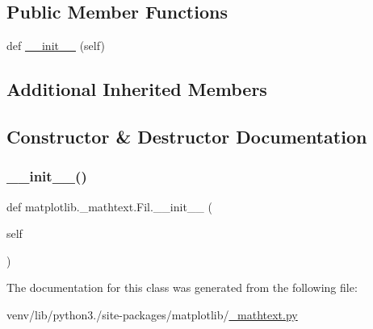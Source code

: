 \subsection*{Public Member Functions}
\begin{DoxyCompactItemize}
\item 
def \hyperlink{classmatplotlib_1_1__mathtext_1_1Fil_a9ff7506fe480a4bd200184d97f469ae5}{\+\_\+\+\_\+init\+\_\+\+\_\+} (self)
\end{DoxyCompactItemize}
\subsection*{Additional Inherited Members}


\subsection{Constructor \& Destructor Documentation}
\mbox{\label{classmatplotlib_1_1__mathtext_1_1Fil_a9ff7506fe480a4bd200184d97f469ae5}} 
\subsubsection{\texorpdfstring{\+\_\+\+\_\+init\+\_\+\+\_\+()}{\_\_init\_\_()}}
{\footnotesize\ttfamily def matplotlib.\+\_\+mathtext.\+Fil.\+\_\+\+\_\+init\+\_\+\+\_\+ (\begin{DoxyParamCaption}\item[{}]{self }\end{DoxyParamCaption})}



The documentation for this class was generated from the following file\+:\begin{DoxyCompactItemize}
\item 
venv/lib/python3./site-\/packages/matplotlib/\hyperlink{__mathtext_8py}{\+\_\+mathtext.\+py}\end{DoxyCompactItemize}
